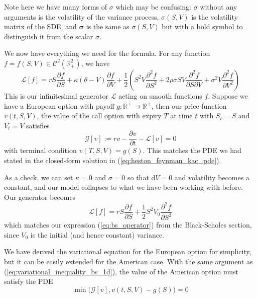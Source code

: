 Note here we have many forms of $\sigma$ which may be confusing: $\sigma$ without any arguments is the volatility of the variance process, $\sigma(S, V)$ is the volatility matrix of the SDE, and $\boldsymbol \sigma$ is the same as $\sigma(S, V)$ but with a bold symbol to distinguish it from the scalar $\sigma$.

We now have everything we need for the formula. For any function $f = f(S, V) \in \mathcal C^2(\mathbb R^2_+)$, we have
\begin{equation}
\mathcal L[f] = rS\frac{\partial f}{\partial S} + \kappa(\theta - V)\frac{\partial f}{\partial V} + \frac 12\left(S^2V \frac{\partial ^2f}{\partial S^2} + 2\rho\sigma SV \frac{\partial ^2f}{\partial S\partial V} + \sigma^2V\frac{\partial ^2f}{\partial V^2} \right)
\end{equation}
This is our infinitesimal generator $\mathcal L$ acting on smooth functions $f$. Suppose we have a European option with payoff $g : \mathbb R^+ \to \mathbb R^+$, then our price function $v(t, S, V)$, the value of the call option with expiry $T$ at time $t$ with $S_t = S$ and $V_t = V$ satisfies
\begin{equation}
\mathcal G[v] := rv - \frac{\partial v}{\partial t} - \mathcal L[v] = 0
\end{equation}
with terminal condition $v(T, S, V) = g(S)$. This matches the PDE we had stated in the closed-form solution in (\ref{eq:heston_feynman_kac_pde}).

As a check, we can set $\kappa = 0$ and $\sigma = 0$ so that $\mathrm dV = 0$ and volatility becomes a constant, and our model collapses to what we have been working with before. Our generator becomes
\begin{equation}
\mathcal L[f] = rS\frac{\partial f}{\partial S} + \frac 12 S^2 V_0\frac{\partial ^2f}{\partial S^2}
\end{equation}
which matches our expression (\ref{eq:bs_operator}) from the Black-Scholes section, since $V_0$ is the initial (and hence constant) variance.

We have derived the variational equation for the European option for simplicity, but it can be easily extended for the American case. With the same argument as (\ref{eq:variational_inequality_bs_1d}), the value of the American option must satisfy the PDE
\begin{equation}
    \min\big(\mathcal G[v], v(t, S, V) - g(S) \big) = 0
\label{eq:heston_variational_inequality}
\end{equation}

